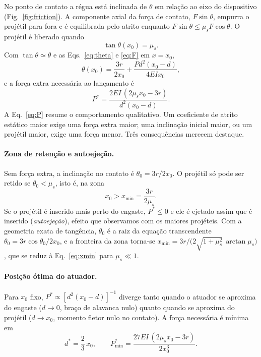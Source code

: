 \documentclass[aps,pre,twocolumn,superscriptaddress,nofootinbib,floatfix]{revtex4-2}
\begin{document}
No ponto de contato a régua está inclinada de $\theta$ em relação ao eixo do dispositivo (Fig.~\ref{fig:friction}). A componente axial da força de contato, $F\sin\theta$, empurra o projétil para fora e é equilibrada pelo atrito enquanto $F\sin\theta\le\mu_sF\cos\theta$. O projétil é liberado quando
\begin{equation}
  \tan\theta(x_0) = \mu_s .
  \label{eq:release}
\end{equation}
Com $\tan\theta\simeq\theta$ e as Eqs.~\eqref{eq:theta} e \eqref{eq:F} em $x=x_0$,
\begin{equation}
  \theta(x_0) = \frac{3r}{2x_0} + \frac{Pd^2(x_0-d)}{4EIx_0},
  \label{eq:theta0}
\end{equation}
e a força extra necessária ao lançamento é
\begin{equation}
  P^\ast = \frac{2EI\,(2\mu_sx_0-3r)}{d^2(x_0-d)} .
  \label{eq:P}
\end{equation}
A Eq.~\eqref{eq:P} resume o comportamento qualitativo. Um coeficiente de atrito estático maior exige uma força extra maior; uma inclinação inicial maior, ou um projétil maior, exige uma força menor. Três consequências merecem destaque.

\paragraph*{Zona de retenção e autoejeção.} Sem força extra, a inclinação no contato é $\theta_0=3r/2x_0$. O projétil só pode ser retido se $\theta_0<\mu_s$, isto é, na zona
\begin{equation}
  x_0 > x_{\min} = \frac{3r}{2\mu_s}.
  \label{eq:xmin}
\end{equation}
Se o projétil é inserido mais perto do engaste, $P^\ast\le0$ e ele é ejetado assim que é inserido (\emph{autoejeção}), efeito que observamos com os maiores projéteis. Com a geometria exata de tangência, $\theta_0$ é a raiz da equação transcendente $\theta_0=3r\cos\theta_0/2x_0$, e a fronteira da zona torna-se $x_{\min}=3r/\big(2\sqrt{1+\mu_s^2}\,\arctan\mu_s\big)$, que se reduz à Eq.~\eqref{eq:xmin} para $\mu_s\ll1$.

\paragraph*{Posição ótima do atuador.} Para $x_0$ fixo, $P^\ast\propto[d^2(x_0-d)]^{-1}$ diverge tanto quando o atuador se aproxima do engaste ($d\to0$, braço de alavanca nulo) quanto quando se aproxima do projétil ($d\to x_0$, momento fletor nulo no contato). A força necessária é mínima em
\begin{equation}
  d^\ast = \frac{2}{3}\,x_0, \qquad P^\ast_{\min} = \frac{27EI\,(2\mu_sx_0-3r)}{2x_0^3}.
  \label{eq:dopt}
\end{equation}
\end{document}
